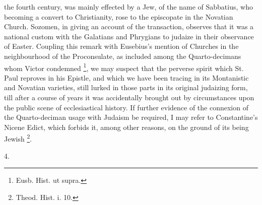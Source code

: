 the fourth century, was mainly effected by a Jew, of the name of
Sabbatius, who becoming a convert to Christianity, rose to the
episcopate in the Novatian Church. Sozomen, in giving an account of
the transaction, observes that it was a national custom with the
Galatians and Phrygians to judaize in their observance of Easter.
Coupling this remark with Eusebius's mention of Churches in the
neighbourhood of the Proconsulate, as included among the Quarto-decimans
whom Victor condemned \footnote{Eusb. Hist. ut supra.},
we may suspect that the perverse spirit which St. Paul reproves in his
Epistle, and which we have been tracing in its Montanistic and
Novatian varieties, still lurked in those parts in its original
judaizing form, till after a course of years it was accidentally
brought out by circumstances upon the public scene of ecclesiastical
history. If further evidence of the connexion of the Quarto-deciman
usage with Judaism be required, I may refer to Constantine's
Nicene Edict, which forbids it, among other reasons, on the ground of
its being Jewish \footnote{Theod. Hist. i. 10.}.

4.

